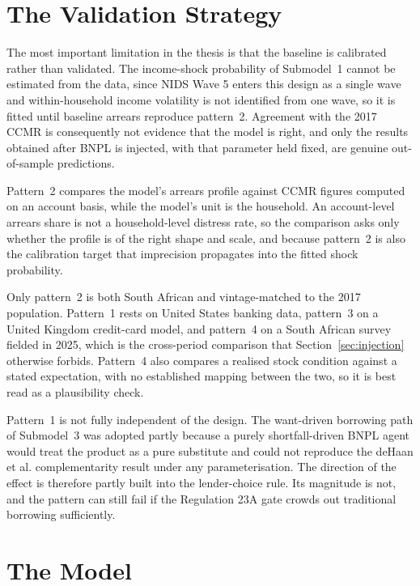 \section{The Validation Strategy}
\label{sec:lim-validation}

\label{sec:lim-calibration}%
The most important limitation in the thesis is that the baseline is calibrated rather than
validated. The income-shock probability of Submodel~1 cannot be estimated from the data, since
\ac{NIDS} Wave 5 enters this design as a single wave and within-household income volatility is not
identified from one wave, so it is fitted until baseline arrears reproduce pattern~2. Agreement
with the 2017 \ac{CCMR} is consequently not evidence that the model is right, and only the results
obtained after \ac{BNPL} is injected, with that parameter held fixed, are genuine out-of-sample
predictions.

\label{sec:lim-units}%
Pattern~2 compares the model's arrears profile against \ac{CCMR} figures computed on an account
basis, while the model's unit is the household. An account-level arrears share is not a
household-level distress rate, so the comparison asks only whether the profile is of the right
shape and scale, and because pattern~2 is also the calibration target that imprecision propagates
into the fitted shock probability.

\label{sec:lim-targets}%
Only pattern~2 is both South African and vintage-matched to the 2017 population. Pattern~1 rests on
United States banking data, pattern~3 on a United Kingdom credit-card model, and pattern~4 on a
South African survey fielded in 2025, which is the cross-period comparison that
Section~\ref{sec:injection} otherwise forbids. Pattern~4 also compares a realised stock condition
against a stated expectation, with no established mapping between the two, so it is best read as a
plausibility check.

\label{sec:lim-pattern1}%
Pattern~1 is not fully independent of the design. The want-driven borrowing path of Submodel~3 was
adopted partly because a purely shortfall-driven \ac{BNPL} agent would treat the product as a pure
substitute and could not reproduce the deHaan et al. complementarity result under any
parameterisation. The direction of the effect is therefore partly built into the lender-choice
rule. Its magnitude is not, and the pattern can still fail if the Regulation 23A gate crowds out
traditional borrowing sufficiently.

\section{The Model}
\label{sec:lim-model}

